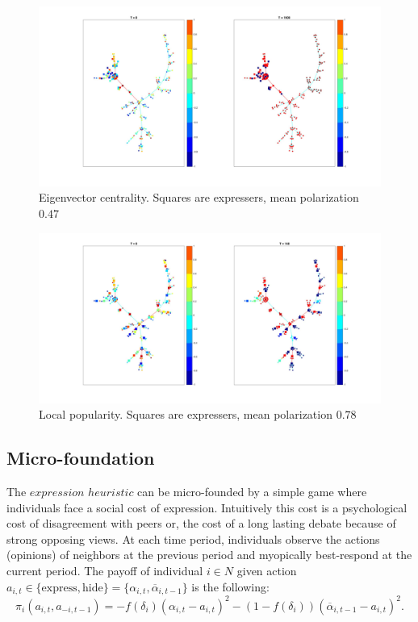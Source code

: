 \documentclass{article}
\begin{document}
\begin{figure}
\hspace{-1cm}
\includegraphics[scale=0.19]{img/example_PD_eigenvector.jpg}
\caption{Eigenvector centrality. Squares are expressers, mean polarization $0.47$}
\label{eigen}
\end{figure}

\begin{figure}
\hspace{-1cm}
\includegraphics[scale=0.19]{img/example_PD_local.jpg}
\caption{Local popularity. Squares are expressers, mean polarization $0.78$}
\label{local}
\end{figure}

\subsection{Micro-foundation} \label{microfoundation}
\noindent The $expression$ $heuristic$ can be micro-founded by a simple game where individuals face a social cost of expression. Intuitively this cost is a psychological cost of disagreement with peers or, the cost of a long lasting debate because of strong opposing views. At each time period, individuals observe the actions (opinions) of neighbors at the previous period and myopically best-respond at the current period. The payoff of individual $i \in N$ given action $a_{i,t} \in \{ \text{express} , \text{hide}\} =\{\alpha_{i,t}, \overline{\alpha}_{i,t-1} \}$ is the following:
\begin{equation}
\pi_i (a_{i,t} , a_{-i,t-1})= - f({\delta_i}{} ) ( \alpha_{i,t} - a_{i,t} )^2 - (1 - f( {\delta_{i}}{})) (\overline{\alpha}_{i,t-1} - a_{i,t})^2.
\label{payoff}
\end{equation}
\end{document}
